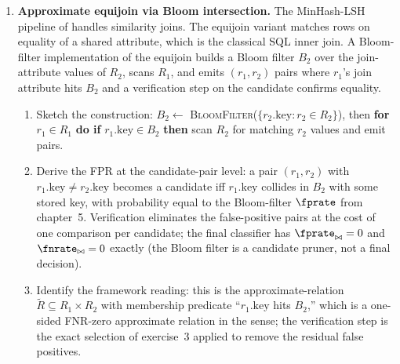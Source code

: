 \begin{enumerate}
\item \exstarstarstar
\label{ex:ch12-10}
\textbf{Approximate equijoin via Bloom intersection.}
The MinHash-LSH pipeline of  handles
similarity joins. The equijoin variant matches rows on equality of
a shared attribute, which is the classical SQL inner join. A
Bloom-filter implementation of the equijoin builds a Bloom filter
$B_2$ over the join-attribute values of $R_2$, scans $R_1$, and
emits $(r_1, r_2)$ pairs where $r_1$'s join attribute hits
$B_2$ and a verification step on the candidate confirms equality.
\begin{enumerate}
  \item[(a)] Sketch the construction: $B_2 \leftarrow$
    \textsc{BloomFilter}($\{r_2.\text{key} : r_2 \in R_2\}$),
    then \textbf{for} $r_1 \in R_1$ \textbf{do if} $r_1.\text{key}
    \in B_2$ \textbf{then} scan $R_2$ for matching $r_2$ values
    and emit pairs.
  \item[(b)] Derive the FPR at the candidate-pair level: a pair
    $(r_1, r_2)$ with $r_1.\text{key} \ne r_2.\text{key}$ becomes
    a candidate iff $r_1.\text{key}$ collides in $B_2$ with some
    stored key, with probability equal to the Bloom-filter
    $\fprate$ from chapter~5. Verification eliminates the
    false-positive pairs at the cost of one comparison per
    candidate; the final classifier has $\fprate_{\bowtie} = 0$
    and $\fnrate_{\bowtie} = 0$ exactly (the Bloom filter is a
    candidate pruner, not a final decision).
  \item[(c)] Identify the framework reading: this is the
    approximate-relation $\tilde R \subseteq R_1 \times R_2$ with
    membership predicate ``$r_1.\text{key}$ hits $B_2$,'' which
    is a one-sided FNR-zero approximate relation in the
     sense; the verification step
    is the exact selection of exercise~3 applied to remove the
    residual false positives.
\end{enumerate}


\end{enumerate}
